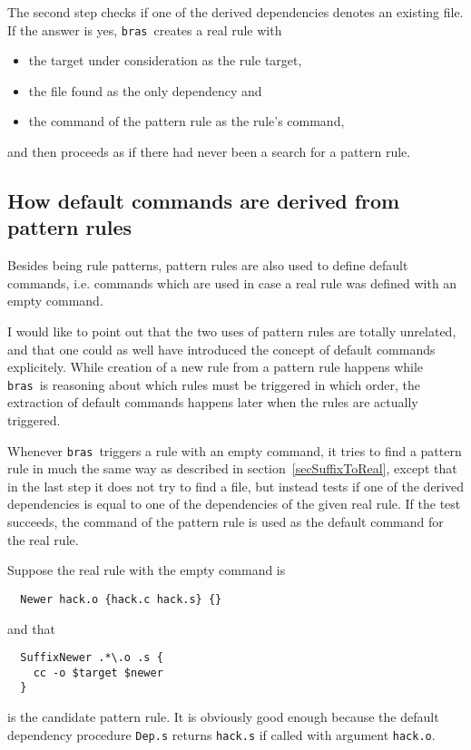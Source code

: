 \documentclass[12pt]{article}
\newcommand{\bras}{\texttt{bras}}
\begin{document}
The second step checks if one of
the derived dependencies denotes an existing file.
If the answer is yes, \bras\ creates a real rule with
\begin{itemize}
\item the target under consideration as the rule target,
\item the file found as the only dependency and
\item the command of the pattern rule as the rule's command,
\end{itemize}
and then proceeds as if there had never been a search for a pattern
rule.

\subsection{How default commands are derived from pattern rules}
\label{secSuffixAsDefCmd}
Besides being rule patterns, pattern rules are also used to define
default commands, i.e. commands which are used in case a real rule was
defined with an empty command.

I would like to point out that the two uses of pattern rules are
totally unrelated, and that one could as well have introduced the
concept of default commands explicitely. While creation of a new rule
from a pattern rule happens while \bras\ is reasoning about which rules
must be triggered in which order, the extraction of default commands
happens later when the rules are actually triggered. 

Whenever \bras\ triggers a rule with an empty command, it tries to
find a pattern rule in much the same way as described in
section~\ref{secSuffixToReal}, except that in the last step it does
not try to find a file, but instead tests if one of the derived
dependencies is equal to one of the dependencies of the given real
rule. If the test succeeds, the command of the pattern rule is used as
the default command for the real rule.

Suppose the real rule with the empty command is
\begin{verbatim}
  Newer hack.o {hack.c hack.s} {}
\end{verbatim}
and that
\begin{verbatim}
  SuffixNewer .*\.o .s {
    cc -o $target $newer
  }
\end{verbatim}
is the candidate pattern rule. It is obviously good enough
because the default dependency procedure \texttt{Dep.s} returns
\texttt{hack.s} if called with argument \texttt{hack.o}.
\end{document}
